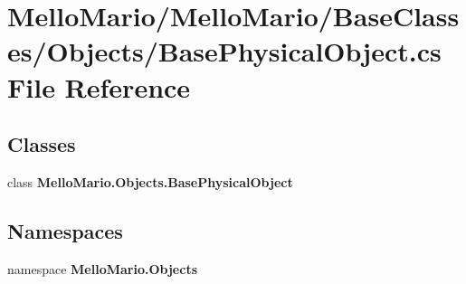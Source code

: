 \section{Mello\+Mario/\+Mello\+Mario/\+Base\+Classes/\+Objects/\+Base\+Physical\+Object.cs File Reference}
\label{BasePhysicalObject_8cs}
\subsection*{Classes}
\begin{DoxyCompactItemize}
\item 
class \textbf{ Mello\+Mario.\+Objects.\+Base\+Physical\+Object}
\end{DoxyCompactItemize}
\subsection*{Namespaces}
\begin{DoxyCompactItemize}
\item 
namespace \textbf{ Mello\+Mario.\+Objects}
\end{DoxyCompactItemize}
